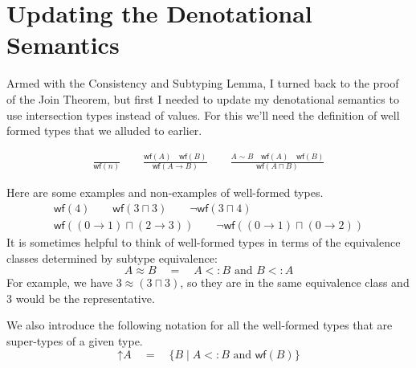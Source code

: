 \documentclass{article}
\newcommand{\WF}[1]{\mathsf{wf}(#1)}
\newcommand{\UP}[1]{\mathord{\uparrow} #1}
\begin{document}
\section{Updating the Denotational Semantics}

Armed with the Consistency and Subtyping Lemma, I turned back to the
proof of the Join Theorem, but first I needed to update my
denotational semantics to use intersection types instead of
values. For this we'll need the definition of well formed types that
we alluded to earlier.

\begin{gather*}
  \frac{}{\WF{n}}
  \qquad
  \frac{\WF{A} \quad \WF{B}}{\WF{A \to B}}
  \qquad
  \frac{A \sim B \quad \WF{A} \quad \WF{B}}{\WF{A \sqcap B}}
\end{gather*}

Here are some examples and non-examples of well-formed types.
\begin{gather*}
  \WF{4} \qquad \WF{3 \sqcap 3} \qquad \neg \WF{3 \sqcap 4} \\
  \WF{(0\to 1) \sqcap (2 \to 3)} \qquad \neg \WF{(0 \to 1) \sqcap (0 \to 2)}
\end{gather*}
It is sometimes helpful to think of well-formed types in terms of the
equivalence classes determined by subtype equivalence:
\[
A \approx B \quad = \quad
  A <: B \text{ and } B <: A
\]
For example, we have $3 \approx (3 \sqcap 3)$, so they are
in the same equivalence class and $3$ would be the representative.


We also introduce the following notation for all the well-formed types
that are super-types of a given type.
\[
   \UP{A} \quad = \quad \{ B\mid A <: B \text{ and } \WF{B} \}
\]
\end{document}
